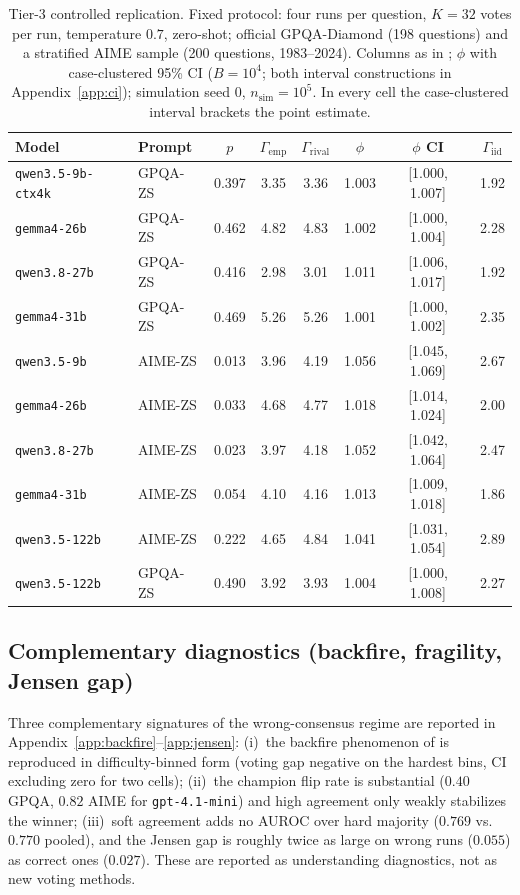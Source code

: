 \documentclass{article}
\newcommand{\agreementIndex}{\Gamma}
\begin{document}
\begin{table}[H]
\centering
\caption{Tier-3 controlled replication. Fixed protocol: four runs per
question, $K=32$ votes per run, temperature $0.7$, zero-shot; official
GPQA-Diamond (198 questions) and a stratified AIME sample (200 questions,
1983--2024). Columns as in ; $\phi$ with case-clustered
95\% CI ($B=10^4$; both interval constructions in
Appendix~\ref{app:ci}); simulation seed 0, $n_{\mathrm{sim}}=10^5$. In
every cell the case-clustered interval brackets the point estimate.}
\label{tab:tier3}
\begin{tabular}{llcccccc}
\toprule
Model & Prompt & $p$ & $\agreementIndex_{\mathrm{emp}}$ & $\agreementIndex_{\mathrm{rival}}$ & $\phi$ & $\phi$ CI & $\agreementIndex_{\mathrm{iid}}$ \\
\midrule
\texttt{qwen3.5-9b-ctx4k} & GPQA-ZS & 0.397 & 3.35 & 3.36 & 1.003 & [1.000, 1.007] & 1.92 \\
\texttt{gemma4-26b} & GPQA-ZS & 0.462 & 4.82 & 4.83 & 1.002 & [1.000, 1.004] & 2.28 \\
\texttt{qwen3.8-27b} & GPQA-ZS & 0.416 & 2.98 & 3.01 & 1.011 & [1.006, 1.017] & 1.92 \\
\texttt{gemma4-31b} & GPQA-ZS & 0.469 & 5.26 & 5.26 & 1.001 & [1.000, 1.002] & 2.35 \\
\texttt{qwen3.5-9b} & AIME-ZS & 0.013 & 3.96 & 4.19 & 1.056 & [1.045, 1.069] & 2.67 \\
\texttt{gemma4-26b} & AIME-ZS & 0.033 & 4.68 & 4.77 & 1.018 & [1.014, 1.024] & 2.00 \\
\texttt{qwen3.8-27b} & AIME-ZS & 0.023 & 3.97 & 4.18 & 1.052 & [1.042, 1.064] & 2.47 \\
\texttt{gemma4-31b} & AIME-ZS & 0.054 & 4.10 & 4.16 & 1.013 & [1.009, 1.018] & 1.86 \\
\texttt{qwen3.5-122b} & AIME-ZS & 0.222 & 4.65 & 4.84 & 1.041 & [1.031, 1.054] & 2.89 \\
\texttt{qwen3.5-122b} & GPQA-ZS & 0.490 & 3.92 & 3.93 & 1.004 & [1.000, 1.008] & 2.27 \\
\bottomrule
\end{tabular}
\end{table}


\subsection{Complementary diagnostics (backfire, fragility, Jensen gap)}
\label{sec:res-backfire}

Three complementary signatures of the wrong-consensus regime are reported
in Appendix~\ref{app:backfire}--\ref{app:jensen}: (i)~the backfire
phenomenon of \cite{bahuguna2026when} is reproduced in difficulty-binned
form (voting gap negative on the hardest bins, CI excluding zero for two
cells); (ii)~the champion flip rate is substantial ($0.40$ GPQA, $0.82$
AIME for \texttt{gpt-4.1-mini}) and high agreement only weakly stabilizes
the winner; (iii)~soft agreement adds no AUROC over hard majority
($0.769$ vs.\ $0.770$ pooled), and the Jensen gap is roughly twice as
large on wrong runs ($0.055$) as correct ones ($0.027$). These are
reported as understanding diagnostics, not as new voting methods.
\end{document}
